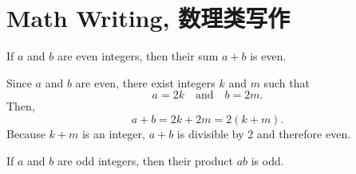     \section{Math Writing, 数理类写作}
        \lipsum[1-2]
        \begin{definition}
            If \(a\) and \(b\) are even integers, then their sum \(a+b\) is even.
        \end{definition}
        \lipsum[3-4]
        \begin{lemma}
            Since \(a\) and \(b\) are even, there exist integers \(k\) and \(m\) such that 
            \[
            a = 2k \quad \text{and} \quad b = 2m.
            \]
            Then,
            \[
            a+b = 2k + 2m = 2(k+m).
            \]
            Because \(k+m\) is an integer, \(a+b\) is divisible by 2 and therefore even.
        \end{lemma}
        \lipsum[5]
        \begin{corollary}
            If \(a\) and \(b\) are odd integers, then their product \(ab\) is odd.
        \end{corollary}
        \lipsum[6-7]
        \begin{corollary}[theorem][Newton@ImNewton!YouAreNewton]
            \lipsum[8
        \end{corollary}
        \lipsum[10-11]
